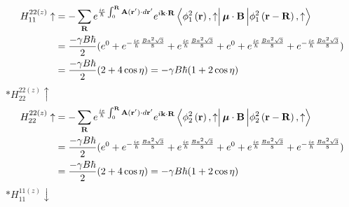 \documentclass{report}
\newcommand{\f}[2]{\dfrac{#1}{#2}}
\begin{document}
\begin{align*}
	H_{11}^{22(z)} \uparrow & = - \sum_{\mathbf{R}} e^{\frac{ie}{\hbar}\int_0^{\mathbf{R}}\mathbf{A}(\mathbf{r'})\cdot d\mathbf{r'}}e^{i\mathbf{k\cdot R}} \bra{\phi^{2}_{1} \left(\mathbf{r}\right), \uparrow} \boldsymbol{\mu}\cdot \mathbf{B} \ket{\phi^{2}_{1} \left(\mathbf{r - R}\right) ,\uparrow} \\
	                        & = \f{ -\gamma B\hbar}{2} (e^{0} + e^{-\frac{ie}{\hbar}\frac{Ba^2\sqrt{3}}{8}} + e^{\frac{ie}{\hbar}\frac{Ba^2\sqrt{3}}{8}} + e^{0} +
	e^{\frac{ie}{\hbar}\frac{Ba^2\sqrt{3}}{8}}
	+ e^{-\frac{ie}{\hbar}\frac{Ba^2\sqrt{3}}{8}} )                                                                                                                                                                                                                                                       \\
	                        & = \f{-\gamma B\hbar}{2} (2 + 4\cos\eta)  = -\gamma B\hbar(1+2\cos\eta)
\end{align*}
$\ast 	H_{22}^{22(z)} \uparrow$
\begin{align*}
	H_{22}^{22(z)} \uparrow & = - \sum_{\mathbf{R}} e^{\frac{ie}{\hbar}\int_0^{\mathbf{R}}\mathbf{A}(\mathbf{r'})\cdot d\mathbf{r'}}e^{i\mathbf{k\cdot R}} \bra{\phi^{2}_{2} \left(\mathbf{r}\right), \uparrow} \boldsymbol{\mu}\cdot \mathbf{B} \ket{\phi^{2}_{2} \left(\mathbf{r - R}\right) ,\uparrow} \\
	                        & = \f{ -\gamma B\hbar}{2} (e^{0} + e^{-\frac{ie}{\hbar}\frac{Ba^2\sqrt{3}}{8}} + e^{\frac{ie}{\hbar}\frac{Ba^2\sqrt{3}}{8}} + e^{0} +
	e^{\frac{ie}{\hbar}\frac{Ba^2\sqrt{3}}{8}}
	+ e^{-\frac{ie}{\hbar}\frac{Ba^2\sqrt{3}}{8}} )                                                                                                                                                                                                                                                       \\
	                        & = \f{-\gamma B\hbar}{2} (2 + 4\cos\eta)  = -\gamma B\hbar(1+2\cos\eta)
\end{align*}
$\ast 	H_{11}^{11(z)} \downarrow$
\end{document}
